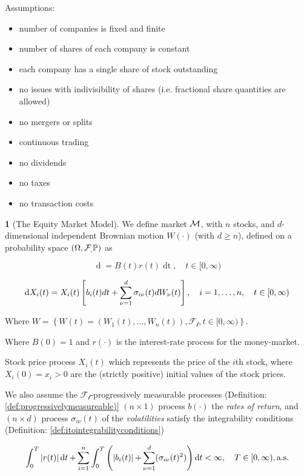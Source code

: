 \documentclass[british]{amsart}
\numberwithin{equation}{section}
\numberwithin{figure}{section}
\theoremstyle{plain}
\theoremstyle{definition}
\newtheorem{defn}[thm]{\protect\definitionname}
\theoremstyle{plain}
\theoremstyle{plain}
\theoremstyle{plain}
\theoremstyle{remark}
\theoremstyle{plain}
\providecommand{\definitionname}{Definition}
\renewcommand{\d}[1]{\mathop{\mathrm{d}{#1}}}
\newcommand{\ranget}{t\in[0,\infty)}
\newcommand{\filtration}[1]{\mathcal{F_{#1}}}
\newcommand{\almostsurely}{\text{a.s.}}
\begin{document}
Assumptions:
\begin{itemize}
	\item number of companies is fixed and finite
	\item number of shares of each company is constant
	\item each company has a single share of stock outstanding
	\item no issues with indivisibility of shares (i.e. fractional share 
				quantities are allowed)
	\item no mergers or splits
	\item continuous trading
	\item no dividends
	\item no taxes
	\item no transaction costs
\end{itemize}

\begin{defn} [The Equity Market Model]
	\label{def:marketmodel}
 	\cite{fernholz2009} 
	We define market $\mathcal{M}$, with $n$ stocks, and $d$-dimensional independent Brownian 
	motion $W(\cdot)$ (with $d \ge n$), defined on a probability space 
	$\probabilityspace$ as

	\begin{equation*}
		\label{eq:equitymarketmodelriskfree}
		\d{B(t)} = B(t)r(t)\d{t},
		\quad \ranget
	\end{equation*}

	\begin{equation}
		\label{eq:stockpriceprocess}
		\d{X_{i}(t)} = X_{i}(t) 
				\left[
					b_{i}(t)dt + 
					\sum_{\nu=1}^{d} \sigma_{i\nu}(t) dW_{\nu}(t)
				\right],
				\quad \rangei,
				\quad \ranget
	\end{equation}

	Where $W = \left\{ W(t)=(W_{1}(t),...,W_{n}(t)),\filtration{t},\ranget \right\}$.

	Where $B(0)=1$ and $r(\cdot)$ is the interest-rate process for the money-market.

	Stock price process $X_{i}(t)$ which represents the price of the $i$th stock, where 
	$X_{i}(0) = x_{i} > 0$ are the (strictly positive) initial values of the stock prices.

	We also assume the $\filtration{t}$-progressively measurable processes (Definition: 
	\ref{def:progressivelymeasureable)} $(n \times 1)$ process $b(\cdot)$ the 
	\textit{rates of return}, and $(n \times d)$ process $\sigma_{i\nu}(t)$ of the 
	\textit{volatilities} satisfy the integrability conditions (Definition: 
	\ref{def:itointegrabilityconditions})

	\begin{equation*}
		\int_{0}^{T} 
		\abs{r(t)} 
		\d{t} +
		\sum_{i=1}^{n} \int_{0}^{T} 
			\left( 
					\abs{b_{i}(t)} +
					\sum_{\nu=1}^{d} ( \sigma_{i\nu}(t)^2  ) 
					\right) \d{t} < \infty,
		\quad
		T \in [0, \infty),
		\almostsurely
	 \end{equation*}

\end{defn}
\end{document}
